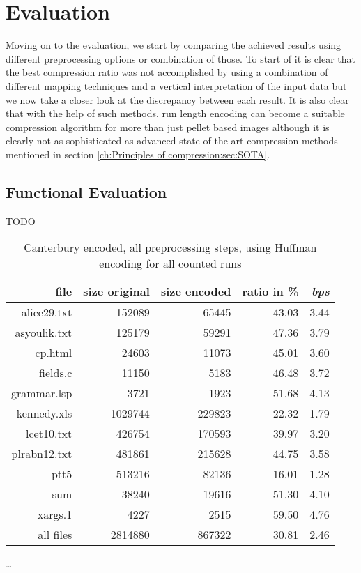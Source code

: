 
\chapter{Evaluation}
\label{ch:Evaluation}
Moving on to the evaluation, we start by comparing the achieved results using different preprocessing options or combination of those. To start of it is clear that the best compression ratio was not accomplished by using a combination of different mapping techniques and a vertical interpretation of the input data but we now take a closer look at the discrepancy between each result. It is also clear that with the help of such methods, run length encoding can become a suitable compression algorithm for more than just pellet based images although it is clearly not as sophisticated as advanced state of the art compression methods mentioned in section \ref{ch:Principles of compression:sec:SOTA}.

\section{Functional Evaluation}
\label{ch:Evaluation:sec:Functional Evaluation}

\par{
	TODO
}
	\begin{table}[h]
	\centering
	\begin{tabular}{r|r|r|r|r}	
		file & size original & size encoded & ratio in \% & \textit{bps}\\
		\hline
alice29.txt & 152089 & 65445 & 43.03 & 3.44 \\
asyoulik.txt & 125179 & 59291 & 47.36 & 3.79 \\
cp.html & 24603 & 11073 & 45.01 & 3.60 \\
fields.c & 11150 & 5183 & 46.48 & 3.72 \\
grammar.lsp & 3721 & 1923 & 51.68 & 4.13 \\
kennedy.xls & 1029744 & 229823 & 22.32 & 1.79 \\
lcet10.txt & 426754 & 170593 & 39.97 & 3.20 \\
plrabn12.txt & 481861 & 215628 & 44.75 & 3.58 \\
ptt5 & 513216 & 82136 & 16.01 & 1.28 \\
sum & 38240 & 19616 & 51.30 & 4.10 \\
xargs.1 & 4227 & 2515 & 59.50 & 4.76 \\
		\hline
		all files & 2814880 & 867322 & 30.81 & 2.46
	\end{tabular}
	\caption{Canterbury encoded, all preprocessing steps, using Huffman encoding for all counted runs}
	\label{tab:t100:Canterbury encoded, all preprocessing steps, using Huffman encoding for all counted runs}
\end{table}
\ldots
